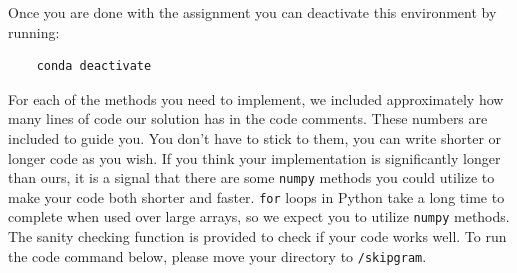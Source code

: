 \documentclass{assignment format}
\begin{document}
Once you are done with the assignment you can deactivate this environment by running:
\begin{verbatim}
    conda deactivate
\end{verbatim}
For each of the methods you need to implement, we included approximately how many lines of code our solution has in the code comments. These numbers are included to guide you. You don't have to stick to them, you can write shorter or longer code as you wish. If you think your implementation is significantly longer than ours, it is a signal that there are some \texttt{numpy} methods you could utilize to make your code both shorter and faster. \texttt{for} loops in Python take a long time to complete when used over large arrays, so we expect you to utilize \texttt{numpy} methods. The sanity checking function is provided to check if your code works well.
\newline
To run the code command below, please move your directory to \texttt{/skipgram}.
\end{document}
